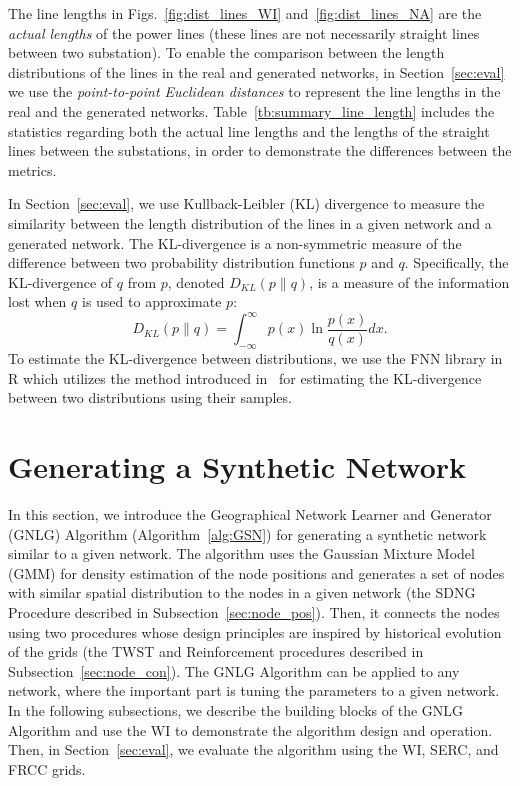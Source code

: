 \documentclass[10pt,journal]{IEEEtran}
\begin{document}
The line lengths in Figs.~\ref{fig:dist_lines_WI} and~\ref{fig:dist_lines_NA} are the \emph{actual lengths} of the power lines (these lines are not necessarily straight lines between two substation). To enable the comparison between the length distributions of the lines in the real and generated networks, in Section~\ref{sec:eval} we use the \emph{point-to-point Euclidean distances} to represent the line lengths in the real and the generated networks.  Table~\ref{tb:summary_line_length} includes the statistics regarding both the actual line lengths and the lengths of the straight lines between the substations, in order to demonstrate the differences between the metrics.

In Section~\ref{sec:eval}, we use Kullback-Leibler (KL) divergence to measure the similarity between the length distribution of the lines in a given network and a generated network.  The KL-divergence is a non-symmetric measure of the difference between two probability distribution functions $p$ and $q$. Specifically, the KL-divergence of $q$ from $p$, denoted $D_{KL}(p\|q)$, is a measure of the information lost when $q$ is used to approximate $p$:
 \begin{equation*}
 D_{KL}(p\|q)=\int_{-\infty}^{\infty} p(x)\ln\frac{p(x)}{q(x)} dx.
 \end{equation*}
 To estimate the KL-divergence between distributions, we use the {\ttfamily FNN} library in {\ttfamily R} which utilizes the method introduced in~\cite{boltz2009high} for estimating the KL-divergence between two distributions using their samples.



\section{Generating a Synthetic Network}\label{sec:gen_net}
In this section, we introduce the Geographical Network Learner and Generator (GNLG) Algorithm (Algorithm~\ref{alg:GSN}) for generating a synthetic network similar to a given network. The algorithm uses the Gaussian Mixture Model (GMM) for density estimation of the node positions and generates a set of nodes with similar spatial distribution to the nodes in a given network (the SDNG Procedure described in Subsection~\ref{sec:node_pos}). Then, it connects the nodes using two procedures whose design principles are inspired by historical evolution of the grids (the TWST and Reinforcement procedures described in Subsection~\ref{sec:node_con}).
The GNLG Algorithm can be applied to any network, where the important part is tuning the parameters to a given network.
In the following subsections, we describe the building blocks of the GNLG Algorithm and use the WI to demonstrate the algorithm design and operation. Then, in Section~\ref{sec:eval}, we evaluate the algorithm using the WI, SERC, and FRCC grids.
\end{document}
